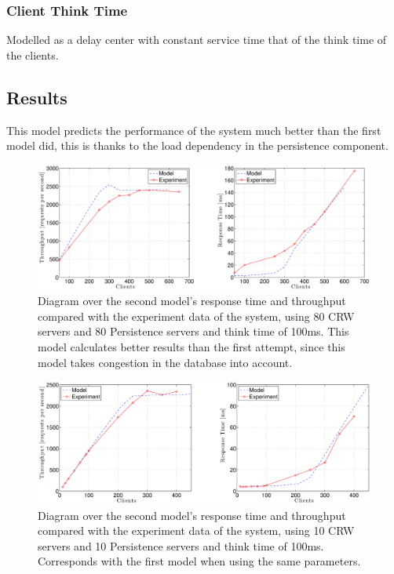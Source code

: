 \documentclass[a4paper, 11pt]{article}
\begin{document}
	\subsubsection{Client Think Time}
		Modelled as a delay center with constant service time that of the think time of the clients.

\subsection{Results}
	This model predicts the performance of the system much better than the first model did, this is thanks to the load dependency in the persistence component.
	\FloatBarrier
	\begin{figure}[cht!]
		\centering
			\includegraphics[width=1\linewidth,keepaspectratio]{secondRealAndModel}
		\caption{Diagram over the second model's response time and throughput compared with the experiment data of the system, using 80 CRW servers and 80 Persistence servers and think time of 100ms. This model calculates better results than the first attempt, since this model takes congestion in the database into account.}
		\label{fig:secondmodelResults}
	\end{figure}
	\FloatBarrier 
	\begin{figure}[cht!]
		\centering
			\includegraphics[width=1\linewidth,keepaspectratio]{secondRealAndModel10Threads}
		\caption{Diagram over the second model's response time and throughput compared with the experiment data of the system, using 10 CRW servers and 10 Persistence servers and think time of 100ms. Corresponds with the first model when using the same parameters.}
		\label{fig:secondmodelResults-10-th}
	\end{figure}
\end{document}
